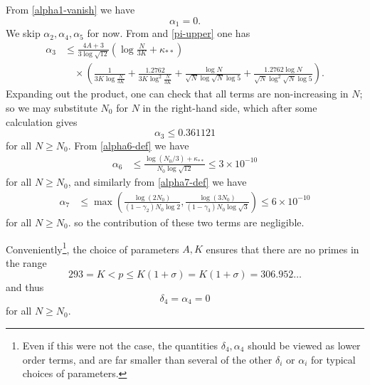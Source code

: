 \documentclass[10pt,a4paper,reqno]{amsart}
\numberwithin{equation}{section}
\theoremstyle{plain}
\theoremstyle{definition}
\begin{document}
From \eqref{alpha1-vanish} we have
$$ \alpha_1 = 0.$$
We skip $\alpha_2, \alpha_4, \alpha_5$ for now.  From  and \eqref{pi-upper} one has
\begin{align*}
  \alpha_3 &\leq \frac{4A+3}{3\log \sqrt{12}} \left(\log \frac{N}{3K} + \kappa_{**}\right)  \\
&\quad \times \left(
  \frac{1}{3K \log\frac{N}{3K}} + \frac{1.2762}{3K \log^2\frac{N}{3K}}
  + \frac{\log N}{\sqrt{N} \log \sqrt{N}\log 5 } + \frac{1.2762 \log N}{\sqrt{N} \log^2 \sqrt{N}\log 5 } \right).
\end{align*}
Expanding out the product, one can check that all terms are non-increasing in $N$; so we may substitute $N_0$ for $N$ in the right-hand side, which after some calculation gives
$$ \alpha_3 \leq 0.361121$$
for all $N \geq N_0$.
From \eqref{alpha6-def} we have
\begin{align*}
   \alpha_6 &\leq \frac{\log(N_0/3) + \kappa_{**}}{N_0 \log \sqrt{12}} \leq 3 \times 10^{-10}
\end{align*}
for all $N \geq N_0$, and similarly from \eqref{alpha7-def} we have
\begin{align*}
\alpha_7 &\leq \max\left( \frac{\log(2N_0)}{(1-\gamma_2)N_0\log 2},  \frac{\log(3N_0)}{(1-\gamma_3)N_0\log \sqrt{3}}\right) \leq 6 \times 10^{-10}
\end{align*}
for all $N \geq N_0$.
so the contribution of these two terms are negligible.

Conveniently\footnote{Even if this were not the case, the quantities $\delta_4,\alpha_4$ should be viewed as lower order terms, and are far smaller than several of the other $\delta_i$ or $\alpha_i$ for typical choices of parameters.}, the choice of parameters $A,K$ ensures that there are no primes in the range
$$ 293 = K < p \leq K(1+\sigma) = K(1+\sigma)=306.952\dots$$
and thus
$$ \delta_4=\alpha_4 = 0$$
for all $N \geq N_0$.
\end{document}
